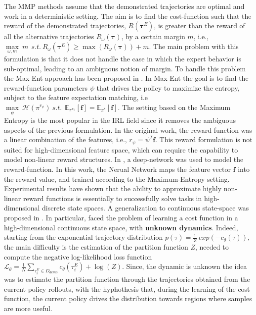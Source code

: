 The MMP methods assume that the demonstrated trajectories are optimal and work in a deterministic setting. The aim is to find the cost-function such that the reward of the demonstrated trajectories, $R(\boldsymbol{\tau}^{E})$, is greater than the reward of all the alternative trajectories $R_{\omega}(\boldsymbol{\tau})$, by a certain margin $m$, i.e., $ \underset{\omega, m}{\max} \ m \  \ s.t. \ R_{\omega}(\boldsymbol{\tau}^{E}) \geq \max (R_{\omega}(\boldsymbol{\tau})) + m$. The main problem with this formulation is that it does not handle the case in which the expert behavior is sub-optimal, leading to an ambiguous notion of margin. To handle this problem the Max-Ent approach has been proposed in \cite{ziebart2008maximum_entropy}. In Max-Ent the goal is to find the reward-function parameters $\psi$ that drives the policy to maximize the entropy, subject to the feature expectation matching, i.e $\underset{\psi}{\max} \ \mathcal{H}(\pi^{r_{\psi}}) \ s.t. \ \ \mathbb{E}_{\pi^{r_{\psi}}}[\mathbf{f}] = \mathbb{E}_{\pi^{*}}[\mathbf{f}]$. The setting based on the Maximum Entropy is the most popular in the IRL field since it removes the ambiguous aspects of the previous formulation. In the original work, the reward-function was a linear combination of the features, i.e., $r_{\psi} = \psi^T \mathbf{f}$. This reward formulation is not suited for high-dimensional feature space, which can require the capability to model non-linear reward structures. In \cite{wulfmeier2015deep_inverse_rl}, a deep-network was used to model the reward-function. In this work, the Nerual Network maps the feature vector $\textbf{f}$ into the reward value, and trained according to the Maximum-Entropy setting. Experimental results have shown that the ability to approximate highly non-linear reward functions is essentially to successfully solve tasks in high-dimensional discrete state spaces. A generalization to continuous state-space was proposed in \cite{finn2016guided_cost_learning}. In particular, \cite{finn2016guided_cost_learning} faced the problem of learning a cost function in a high-dimensional continuous state space, with \textbf{unknown dynamics}. Indeed, starting from the exponential trajectory distribution $p(\tau) = \frac{1}{Z} \ exp(-c_{\theta}(\tau))$, the main difficulty is the estimation of the partition function $Z$, needed to compute the negative log-likelihood loss function $\mathcal{L}_{\theta} = \frac{1}{N} \underset{\tau^{E}_{i} \in D_{demo}}{\sum} c_{\theta}(\tau^{E}_{i}) + \log(Z)$. Since, the dynamic is unknown the idea was to estimate the partition function through the trajectories obtained from the current policy rollouts, with the hyphothesis that, during the learning of the cost function, the current policy drives the distribution towards regions where samples are more useful.%
